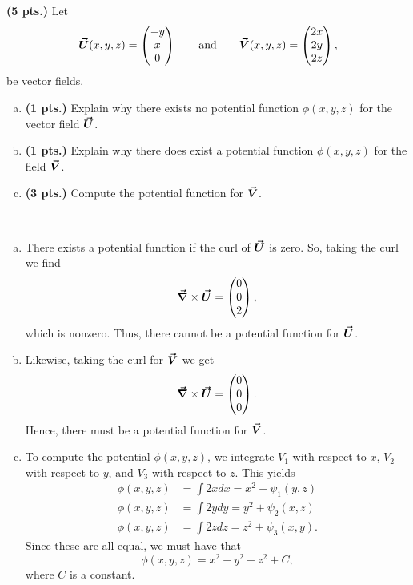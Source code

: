 \documentclass[12pt]{article} %
\begin{document}
\newpage
\begin{problem}
\textbf{(5 pts.)} Let
	\[
	\boldsymbol{\vec{U}}(x,y,z) = \begin{pmatrix} -y \\ x \\ 0 \end{pmatrix} \qquad \textrm{and} \qquad \boldsymbol{\vec{V}}(x,y,z) = \begin{pmatrix} 2x \\ 2y \\ 2z \end{pmatrix},
	\]
	be vector fields.
	\begin{enumerate}[(a)]
		\item \textbf{(1 pts.)} Explain why there exists no potential function $\phi(x,y,z)$ for the vector field $\boldsymbol{\vec{U}}$.
		\item \textbf{(1 pts.)} Explain why there does exist a potential function $\phi(x,y,z)$ for the field $\boldsymbol{\vec{V}}$.
		\item \textbf{(3 pts.)} Compute the potential function for $\boldsymbol{\vec{V}}$.
	\end{enumerate}
\end{problem}
\begin{solution}~
    \begin{enumerate}[(a)]
        \item There exists a potential function if the curl of $\boldsymbol{\vec{U}}$ is zero.  So, taking the curl we find
        \[
        \boldsymbol{\vec{\nabla}} \times \boldsymbol{\vec{U}} = \begin{pmatrix} 0 \\ 0 \\ 2 \end{pmatrix},
        \]
        which is nonzero. Thus, there cannot be a potential function for $\boldsymbol{\vec{U}}$.
        
        \item Likewise, taking the curl for $\boldsymbol{\vec{V}}$ we get
        \[
            \boldsymbol{\vec{\nabla}}\times \boldsymbol{\vec{U}} = \begin{pmatrix} 0 \\ 0 \\ 0 \end{pmatrix}.
        \]
        Hence, there must be a potential function for $\boldsymbol{\vec{V}}$.  
        
        \item To compute the potential $\phi(x,y,z)$, we integrate $V_1$ with respect to $x$, $V_2$ with respect to $y$, and $V_3$ with respect to $z$.  This yields
        \begin{align*}
            \phi(x,y,z) &= \int 2x dx = x^2+\psi_1(y,z)\\
            \phi(x,y,z) &= \int 2y dy = y^2+\psi_2(x,z)\\
            \phi(x,y,z) &= \int 2z dz = z^2+\psi_3(x,y).
        \end{align*}
        Since these are all equal, we must have that
        \[
        \boxed{\phi(x,y,z) = x^2+y^2+z^2+C,}
        \]
        where $C$ is a constant.
    \end{enumerate}
\end{solution}
\end{document}
